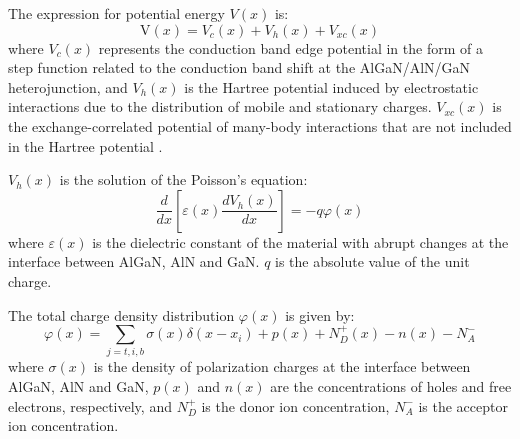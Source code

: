 The expression for potential  energy $V(x)$ is:
\begin{equation}
\mathrm{V}(x)=V_{c}(x)+V_{h}(x)+V_{x c}(x)
\label{eq:2.20}
\end{equation}
where $V_{c}(x)$ represents the conduction band edge potential in the form of a step function related to the conduction band shift at the AlGaN/AlN/GaN heterojunction, and $V_{h}(x)$ is the Hartree potential  induced by electrostatic interactions  due to the distribution of mobile and stationary charges. $V_{x c}(x)$ is the exchange-correlated potential of many-body interactions that are not included in the  Hartree potential \cite{lee2002self}.

$V_{h}(x)$ is the solution of the  Poisson's equation:
\begin{equation}
\frac{d}{d x}\left[\varepsilon(x) \frac{d V_{h}(x)}{d x}\right]=-q \varphi(x)
\label{eq:2.21}
\end{equation}
where $\varepsilon(x)$ is the dielectric constant of the material with abrupt changes at the interface  between AlGaN, AlN and GaN. $q$ is the absolute value of the unit charge.

The total charge density distribution $\varphi(x)$ is given by:
\begin{equation}
\varphi(x)=\sum_{j=t, i, b} \sigma(x) \delta\left(x-x_{i}\right)+p(x)+N_{D}^{+}(x)-n(x)-N_{A}^{-}
\label{eq:2.22}
\end{equation}
where $\sigma(x)$ is the density of polarization charges  at the interface between AlGaN, AlN and GaN, $p(x)$ and $n(x)$ are the concentrations of holes and free electrons, respectively, and $N_{D}^{+}$ is the donor ion concentration, $N_{A}^{-}$ is the acceptor ion concentration.

